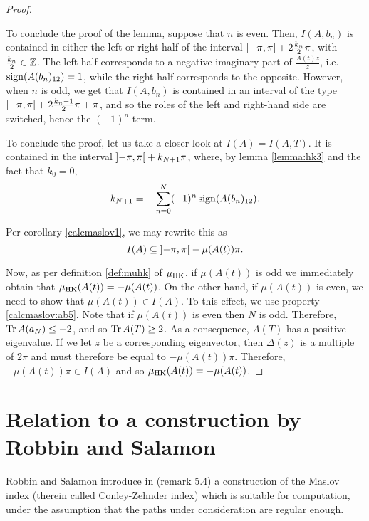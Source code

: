 \begin{proof}
\begin{lemmaproof}
To conclude the proof of the lemma, suppose that $n$ is even. Then, $I(A,b_n)$ is contained in either the left or right half of the interval $\ointerval{-\pi}\pi + 2 \frac{k_n}2 \pi$, with $\frac{k_n}2 \in \mathbb{Z}$. The left half corresponds to a negative imaginary part of $\frac{A(t) z}z$, i.e. $\operatorname{sign}(A(b_n)_{12}) = 1$, while the right half corresponds to the opposite. However, when $n$ is odd, we get that $I(A,b_n)$ is contained in an interval of the type $\ointerval{-\pi}\pi + 2 \frac{k_n - 1}2 \pi + \pi$, and so the roles of the left and right-hand side are switched, hence the $(-1)^n$ term.
\end{lemmaproof}

To conclude the proof, let us take a closer look at $I(A) = I(A,T)$. It is contained in the interval $\ointerval{-\pi}\pi + k_{N+1} \pi$, where, by lemma \ref{lemma:hk3} and the fact that $k_0 = 0$,
\begin{equation}
k_{N+1} = - \sum_{n = 0}^N (-1)^n \operatorname{sign}(A(b_n)_{12}).
\end{equation}

Per corollary \ref{calcmaslov1}, we may rewrite this as
\begin{equation}
I(A) \subseteq \ointerval{-\pi}\pi - \mu(A(t)) \pi.
\end{equation}

Now, as per definition \ref{def:muhk} of $\mu_{\mathrm{HK}}$, if $\mu(A(t))$ is odd we immediately obtain that $\mu_{\mathrm{HK}}(A(t)) = -\mu(A(t))$. On the other hand, if $\mu(A(t))$ is even, we need to show that $\mu(A(t)) \in I(A)$. To this effect, we use property \ref{calcmaslov:ab5}. Note that if $\mu(A(t))$ is even then $N$ is odd. Therefore, $\operatorname{Tr} A(a_N) \leq -2$, and so $\operatorname{Tr} A(T) \geq 2$. As a consequence, $A(T)$ has a positive eigenvalue. If we let $z$ be a corresponding eigenvector, then $\Delta(z)$ is a multiple of $2\pi$ and must therefore be equal to $-\mu(A(t)) \pi$. Therefore, $-\mu(A(t)) \pi \in I(A)$ and so $\mu_{\mathrm{HK}}(A(t)) = -\mu(A(t))$.
\end{proof}

\section{Relation to a construction by Robbin and Salamon}

Robbin and Salamon introduce in \cite{robbin1993maslov} (remark 5.4) a construction of the Maslov index (therein called Conley-Zehnder index) which is suitable for computation, under the assumption that the paths under consideration are regular enough.


